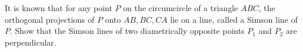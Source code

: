 It is known that for any point $P$ on the circumcircle of a triangle $ABC$,  the orthogonal projections of $P$ onto $AB,BC,CA$ lie on a line, called a Simson line of $P$. Show that the Simson lines of two diametrically opposite points $P_1$ and $P_2$ are perpendicular.